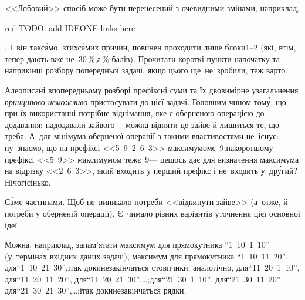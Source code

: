 \Tutorial
{}
<<Лобовий>> спосіб може бути перенесений з очевидними змінами, наприклад,
\begin{Huge}
\begin{color}{red}
TODO: add IDEONE links here
\end{color}
\end{Huge}.
І~він так\nolinebreak[3] с\'{а}мо, з\nolinebreak[3] тих\nolinebreak[3] с\'{а}мих причин, повинен проходити лише блоки\nolinebreak[3] \mbox{1--2} (які, втім, тепер дають вже не~30$\,$\%,\nolinebreak[2] а$\,$\% балів). Прочитати короткі пункти на\nolinebreak[3] початку та наприкінці розбору попередньої задачі, якщо цього ще~не~зробили, теж варто.

Але\nolinebreak[2] описані в\nolinebreak[3] попередньому розборі префіксні суми та їх  двовимірне узагальнення \emph{принципово неможливо} пристосувати до цієї задачі. Головним чином том\'{у}, що при їх використанні потрібне віднімання, яке є оберненою операцією до додавання: надодавали зайвого\nolinebreak[3] --- можна відняти це зайве й лишиться те, що треба. А~для мінімума оберненої операції з такими властивостями не~існує: ну~знаємо, що на префіксі <<5~9~2~6~3>> максимумом\nolinebreak[3] є~9,\linebreak[2] на\nolinebreak[2] коротшому префіксі <<5~9>> максимумом теж\nolinebreak[3] є~9\nolinebreak[3] --- це\nolinebreak[2] щось дає для визначення максимума на відрізку <<2~6~3>>, який входить у перший префікс і не~входить у~др\'{у}гий? Нічогісінько.

 С\'{а}ме частинами. Щоб не~виникало потреби <<відкинути зайве>> (а~отже, й потреби у оберненій операції). Є~чимало різних варіантів уточнення цієї основної ідеї. 

 Можна, наприклад, запам'ятати максимум 
для прямокутника ``1~10~1~10'' (у~термінах вхідних даних задачі), 
максимум для прямокутника ``1~10~11~20'', 
для\nolinebreak[2] ``1~10~21~30'',\linebreak[2] 
і\nolinebreak[2] так доки\nolinebreak[3] не\nolinebreak[2] закінчаться стовпчики; аналогічно, 
для\nolinebreak[2] ``11~20~1~10'',
для\nolinebreak[2] ``11~20~11~20'',
для\nolinebreak[2] ``11~20~21~30'',\nolinebreak[3]
\dots;\linebreak[2]
для\nolinebreak[2] ``21~30~1~10'',
для\nolinebreak[2] ``21~30~11~20'',
для\nolinebreak[2] ``21~30~21~30'',\nolinebreak[3]
\dots;\linebreak[2]
і\nolinebreak[2] так доки\nolinebreak[3] не\nolinebreak[2] закінчаться рядки.


